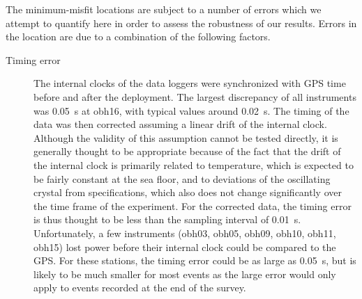 \documentclass[jgr]{agu2001}
\begin{document}
\begin{article}
The minimum-misfit locations are subject to a number of errors which
we attempt to quantify here in order to assess the robustness of our results.
   Errors in the location are due to a combination of
the following factors.
\begin{description}
\item[Timing error]  The internal clocks of the data loggers were
synchronized with GPS time before and after the deployment.  The
largest discrepancy of all instruments was 0.05~s at obh16, with
typical values around 0.02~s.  The
timing of the data was then corrected assuming a linear drift of the
internal clock. Although the validity of this assumption cannot be
tested directly, it is generally thought to be appropriate because of
the fact that the drift of the internal clock is primarily related to
temperature, which is expected to be fairly constant at
the sea floor, and to deviations of the oscillating crystal from
specifications, which also does not change significantly over the 
time frame of the experiment. For the corrected data, the timing error
is thus thought to be less than the sampling interval of 0.01~s.
Unfortunately, a few instruments (obh03,
obh05, obh09, obh10, obh11, obh15) lost
power before their internal clock could be compared to the GPS.  For
these stations, the timing error could be as large as 0.05~s, but is
likely to be much smaller for most events as the large error would
only apply to events recorded at the end of the survey.


\end{description}
\end{article}
\end{document}
